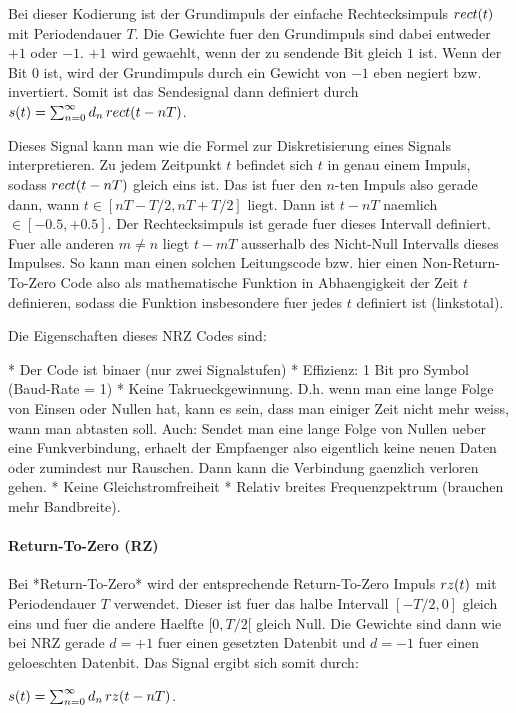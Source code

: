 Bei dieser Kodierung ist der Grundimpuls der einfache Rechtecksimpuls $\mathop{rect}(t)$ mit Periodendauer $T$. Die Gewichte fuer den Grundimpuls sind dabei entweder $+1$ oder $-1$. $+1$ wird gewaehlt, wenn der zu sendende Bit gleich $1$ ist. Wenn der Bit $0$ ist, wird der Grundimpuls durch ein Gewicht von $-1$ eben negiert bzw. invertiert. Somit ist das Sendesignal dann definiert durch $s(t) = \sum_{n=0}^\infty d_n \mathop{rect}(t - nT)$.

Dieses Signal kann man wie die Formel zur Diskretisierung eines Signals interpretieren. Zu jedem Zeitpunkt $t$ befindet sich $t$ in genau einem Impuls, sodass $\mathop{rect}(t - nT)$ gleich eins ist. Das ist fuer den $n$-ten Impuls also gerade dann, wann $t \in [nT - T/2, nT + T/2]$
liegt. Dann ist $t - nT$ naemlich $\in [-0.5, +0.5]$. Der Rechtecksimpuls ist
gerade fuer dieses Intervall definiert. Fuer alle anderen $m \neq n$ liegt $t -
mT$ ausserhalb des Nicht-Null Intervalls dieses Impulses. So kann man einen
solchen Leitungscode bzw. hier einen Non-Return-To-Zero Code also als
mathematische Funktion in Abhaengigkeit der Zeit $t$ definieren, sodass die
Funktion insbesondere fuer jedes $t$ definiert ist (linkstotal).

Die Eigenschaften dieses NRZ Codes sind:

* Der Code ist binaer (nur zwei Signalstufen)
* Effizienz: 1 Bit pro Symbol (Baud-Rate = 1)
* Keine Takrueckgewinnung. D.h. wenn man eine lange Folge von Einsen oder Nullen
  hat, kann es sein, dass man einiger Zeit nicht mehr weiss, wann man abtasten
  soll. Auch: Sendet man eine lange Folge von Nullen ueber eine Funkverbindung,
  erhaelt der Empfaenger also eigentlich keine neuen Daten oder zumindest nur
  Rauschen. Dann kann die Verbindung gaenzlich verloren gehen.
* Keine Gleichstromfreiheit
* Relativ breites Frequenzpektrum (brauchen mehr Bandbreite).

\paragraph{ Return-To-Zero (RZ)}

Bei *Return-To-Zero* wird der entsprechende Return-To-Zero Impuls $\mathop{rz}(t)$
mit Periodendauer $T$ verwendet. Dieser ist fuer das halbe Intervall $[-T/2, 0]$
gleich eins und fuer die andere Haelfte $[0, T/2[$ gleich Null. Die Gewichte sind dann wie
bei NRZ gerade $d = +1$ fuer einen gesetzten Datenbit und $d = -1$ fuer einen
geloeschten Datenbit. Das Signal ergibt sich somit durch:

$s(t) = \sum_{n=0}^\infty d_n \mathop{rz}(t - nT)$.

